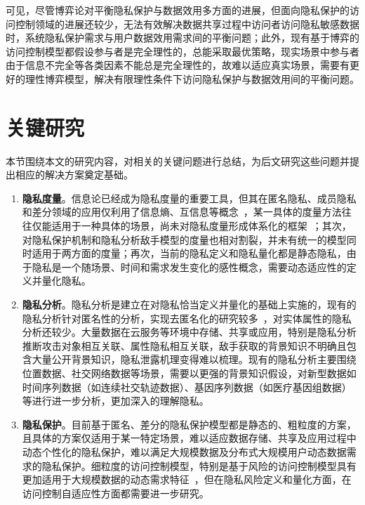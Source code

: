 可见，尽管博弈论对平衡隐私保护与数据效用多方面的进展，但面向隐私保护的访问控制领域的进展还较少，无法有效解决数据共享过程中访问者访问隐私敏感数据时，系统隐私保护需求与用户数据效用需求间的平衡问题；此外，现有基于博弈的访问控制模型都假设参与者是完全理性的，总能采取最优策略，现实场景中参与者由于信息不完全等各类因素不能总是完全理性的，故难以适应真实场景，需要有更好的理性博弈模型，解决有限理性条件下访问隐私保护与数据效用间的平衡问题。

\section{关键研究}

本节围绕本文的研究内容，对相关的关键问题进行总结，为后文研究这些问题并提出相应的解决方案奠定基础。

\begin{enumerate}
	\item \textbf{隐私度量}。信息论已经成为隐私度量的重要工具，但其在匿名隐私、成员隐私和差分领域的应用仅利用了信息熵、互信息等概念~\cite{wagner2018technical}，某一具体的度量方法往往仅能适用于一种具体的场景，尚未对隐私度量形成体系化的框架~\cite{shokri2011quantifying,manousakas2018quantifying}；其次，对隐私保护机制和隐私分析敌手模型的度量也相对割裂，并未有统一的模型同时适用于两方面的度量；再次，当前的隐私定义和隐私量化都是静态隐私，由于隐私是一个随场景、时间和需求发生变化的感性概念，需要动态适应性的定义并量化隐私。
	
	
	\item \textbf{隐私分析}。隐私分析是建立在对隐私恰当定义并量化的基础上实施的，现有的隐私分析针对匿名性的分析，实现去匿名化的研究较多~\cite{lin2009lbs,manousakas2018quantifying}，对实体属性的隐私分析还较少。大量数据在云服务等环境中存储、共享或应用，特别是隐私分析推断攻击对象相互关联、属性隐私相互关联，敌手获取的背景知识不明确且包含大量公开背景知识，隐私泄露机理变得难以梳理。现有的隐私分析主要围绕位置数据、社交网络数据等场景，需要以更强的背景知识假设，对新型数据如时间序列数据（如连续社交轨迹数据）、基因序列数据（如医疗基因组数据）等进行进一步分析，更加深入的理解隐私。
	
	\item  \textbf{隐私保护}。目前基于匿名、差分的隐私保护模型都是静态的、粗粒度的方案，且具体的方案仅适用于某一特定场景，难以适应数据存储、共享及应用过程中动态个性化的隐私保护，难以满足大规模数据及分布式大规模用户动态数据需求的隐私保护。细粒度的访问控制模型，特别是基于风险的访问控制模型具有更加适用于大规模数据的动态需求特征~\cite{li2017access}，但在隐私风险定义和量化方面，在访问控制自适应性方面都需要进一步研究。
	

\end{enumerate}
